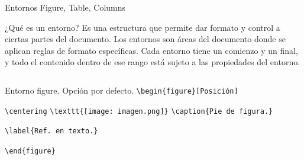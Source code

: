 \documentclass[aspectratio=169, 10pt]{beamer}
\begin{document}
\begin{frame}[fragile]{Entornos Figure, Table, Columns}

\begin{alertblock}{¿Qué es un entorno?}
\justifying
    Es una estructura que permite dar formato y control a ciertas partes del documento. Los entornos son áreas del documento donde se aplican reglas de formato específicas. Cada entorno tiene un comienzo y un final, y todo el contenido dentro de ese rango está sujeto a las propiedades del entorno.
\end{alertblock}

\vspace{0.5mm}


\begin{columns}\pause

    \begin{column}{.68\linewidth}        
    \begin{block}{Entorno figure. Opción por defecto.}
        \verb|\begin{figure}[Posición]|
        
                \verb|\centering|
                   \verb|\texttt{[image: imagen.png]}|
                \verb|\caption{Pie de figura.}|
                
                \verb|\label{Ref. en texto.}|
                
        \verb|\end{figure}|

    \end{block}    
    \end{column}

\end{columns}
\end{frame}
\end{document}
